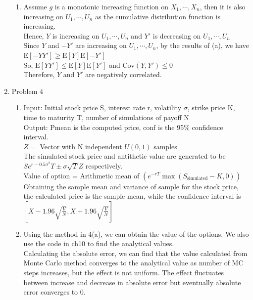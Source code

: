 \documentclass[a4paper]{article}
\def\E{\mathrm{E}}
\def\Cov{\mathrm{Cov}}
\begin{document}
\begin{enumerate}
\begin{enumerate}
\item
Assume $g$ is a monotonic increasing function on $X_1,\cdots,X_n$, then it is also increasing on $U_1,\cdots,U_n$ as the cumulative distribution function is increasing.\\
Hence, $Y$ is increasing on $U_1,\cdots,U_n$ and $Y'$ is decreasing on $U_1,\cdots,U_n$\\
Since $Y$ and $-Y'$ are increasing on $U_1,\cdots,U_n$, by the results of (a), we have $\E\left[-YY'\right]\geq\E\left[Y\right]\E\left[-Y'\right]$\\
So, $\E\left[YY'\right]\leq\E\left[Y\right]\E\left[Y'\right]$ and $\Cov(Y,Y')\leq 0$\\
Therefore, $Y$ and $Y'$ are negatively correlated.

\end{enumerate}

\pagebreak

\item Problem 4
\begin{enumerate}
\item
Input: Initial stock price S, interest rate r, volatility $\sigma$, strike price K, time to maturity T, number of simulations of payoff N\\
Output: Pmean is the computed price, conf is the 95\% confidence interval.\\
$Z =$ Vector with N independent $U(0,1)$ samples\\
The simulated stock price and antithetic value are generated to be $Se^{r-0.5\sigma^2}T\pm\sigma\sqrt{T}Z$ respectively.\\
Value of option = Arithmetic mean of $(e^{-rT}\max(S_\text{simulated}-K,0))$\\
Obtaining the sample mean and variance of sample for the stock price, the calculated price is the sample mean, while the confidence interval is $\left[X-1.96\sqrt{\frac{V}{N}},X+1.96\sqrt{\frac{V}{N}} \right]$


\item
Using the method in 4(a), we can obtain the value of the options. We also use the code in ch10 to find the analytical values.\\
Calculating the absolute error, we can find that the value calculated from Monte Carlo method converges to the analytical value as number of MC steps increases, but the effect is not uniform. The effect fluctuates between increase and decrease in absolute error but eventually absolute error converges to 0.\\


\end{enumerate}
\end{enumerate}
\end{document}
